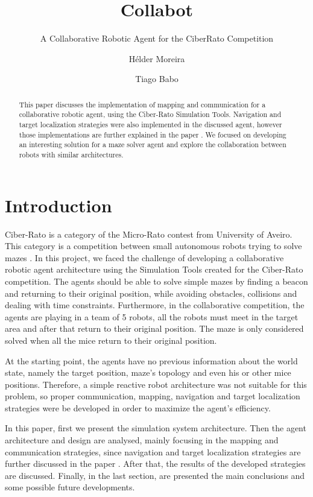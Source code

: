 \documentclass[oribibl]{llncs}
\title{Collabot}
\subtitle{A Collaborative Robotic Agent for the CiberRato Competition}
\author{Hélder Moreira \and Tiago Babo}
\institute{Faculdade de Engenharia da Universidade do Porto}
\begin{document}
\maketitle
\begin{abstract}
This paper discusses the implementation of mapping and communication for a collaborative robotic agent, using the Ciber-Rato Simulation Tools. Navigation and target localization strategies were also implemented in the discussed agent, however those implementations are further explained in the paper \cite{varelaepontes}.
We focused on developing an interesting solution for a maze solver agent and explore the collaboration between robots with similar architectures.
\end{abstract}

\section{Introduction}
Ciber-Rato is a category of the Micro-Rato contest from University of Aveiro.
This category is a competition between small autonomous robots trying to solve mazes \cite{Lau2002}. 
In this project, we faced the challenge of developing a collaborative robotic agent architecture using the Simulation Tools created for the Ciber-Rato competition. The agents should be able to solve simple mazes by finding a beacon and returning to their original position, while avoiding obstacles, collisions and dealing with time constraints. Furthermore, in the collaborative competition, the agents are playing in a team of 5 robots, all the robots must meet in the target area and after that return to their original position. The maze is only considered solved when all the mice return to their original position.

At the starting point, the agents have no previous information about the world state, namely the target position, maze's topology and even his or other mice positions. Therefore, a simple reactive robot architecture was not suitable for this problem, so proper communication, mapping, navigation and target localization strategies were be developed in order to maximize the agent's efficiency.

In this paper, first we present the simulation system architecture. Then the agent architecture and design are analysed, mainly focusing in the mapping and communication strategies, since navigation and target localization strategies are further discussed in the paper \cite{varelaepointes}. After that, the results of the developed strategies are discussed. Finally, in the last section, are presented the main conclusions and some possible future developments.
\end{document}
